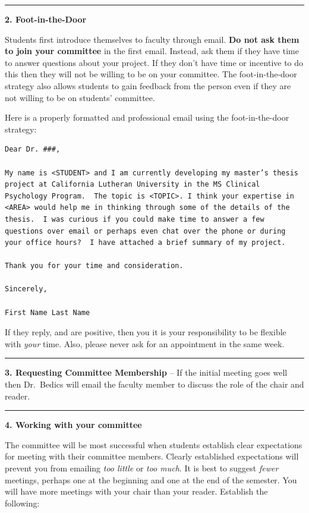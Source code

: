 \documentclass[openany]{book}
\begin{document}
\begin{center}\rule{0.5\linewidth}{0.5pt}\end{center}

\textbf{2. Foot-in-the-Door}

Students first introduce themselves to faculty through email. \textbf{Do not ask them to join your committee} in the first email. Instead, ask them if they have time to answer questions about your project. If they don't have time or incentive to do this then they will not be willing to be on your committee. The foot-in-the-door strategy also allows students to gain feedback from the person even if they are not willing to be on students' committee.

Here is a properly formatted and professional email using the foot-in-the-door strategy:

\begin{verbatim}
Dear Dr. ###,

My name is <STUDENT> and I am currently developing my master’s thesis project at California Lutheran University in the MS Clinical Psychology Program.  The topic is <TOPIC>. I think your expertise in <AREA> would help me in thinking through some of the details of the thesis.  I was curious if you could make time to answer a few questions over email or perhaps even chat over the phone or during your office hours?  I have attached a brief summary of my project.

Thank you for your time and consideration.

Sincerely,

First Name Last Name
\end{verbatim}

If they reply, and are positive, then you it is your responsibility to be flexible with \emph{your} time. Also, please never ask for an appointment in the same week.

\begin{center}\rule{0.5\linewidth}{0.5pt}\end{center}

\textbf{3. Requesting Committee Membership} -- If the initial meeting goes well then Dr.~Bedics will email the faculty member to discuss the role of the chair and reader.

\begin{center}\rule{0.5\linewidth}{0.5pt}\end{center}

\textbf{4. Working with your committee}

The committee will be most successful when students establish clear expectations for meeting with their committee members. Clearly established expectations will prevent you from emailing \emph{too little} or \emph{too much}. It is best to suggest \emph{fewer} meetings, perhaps one at the beginning and one at the end of the semester. You will have more meetings with your chair than your reader. Establish the following:
\end{document}
